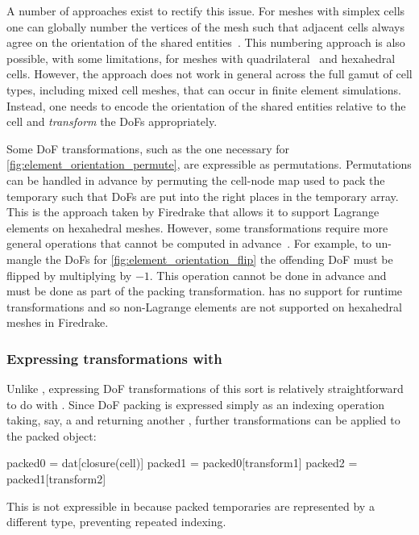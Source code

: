 \documentclass[thesis]{subfiles}
\begin{document}
A number of approaches exist to rectify this issue.
For meshes with simplex cells one can globally number the vertices of the mesh such that adjacent cells always agree on the orientation of the shared entities~\cite{rognesEfficientAssemblyDiv2010}.
This numbering approach is also possible, with some limitations, for meshes with quadrilateral~\cite{homolyaParallelEdgeOrientation2016} and hexahedral~\cite{agelekOrientingEdgesUnstructured2017} cells.
However, the approach does not work in general across the full gamut of cell types, including mixed cell meshes, that can occur in finite element simulations.
Instead, one needs to encode the orientation of the shared entities relative to the cell and \emph{transform} the DoFs appropriately.

Some DoF transformations, such as the one necessary for \cref{fig:element_orientation_permute}, are expressible as permutations.
Permutations can be handled in advance by permuting the cell-node map used to pack the temporary such that DoFs are put into the right places in the temporary array.
This is the approach taken by Firedrake that allows it to support Lagrange elements on hexahedral meshes.
However, some transformations require more general operations that cannot be computed in advance~\cite{scroggsBasixRuntimeFinite2022,scroggsConstructionArbitraryOrder2021}.
For example, to un-mangle the DoFs for \cref{fig:element_orientation_flip} the offending DoF must be flipped by multiplying by $-1$.
This operation cannot be done in advance and must be done as part of the packing transformation.
 has no support for runtime transformations and so non-Lagrange elements are not supported on hexahedral meshes in Firedrake.

\subsubsection{Expressing transformations with }

Unlike , expressing DoF transformations of this sort is relatively straightforward to do with .
Since DoF packing is expressed simply as an indexing operation taking, say, a  and returning another , further transformations can be applied to the packed object:
\begin{pyinline}
  packed0 = dat[closure(cell)]
  packed1 = packed0[transform1]
  packed2 = packed1[transform2]
\end{pyinline}
This is not expressible in  because packed temporaries are represented by a different type, preventing repeated indexing.
\end{document}
